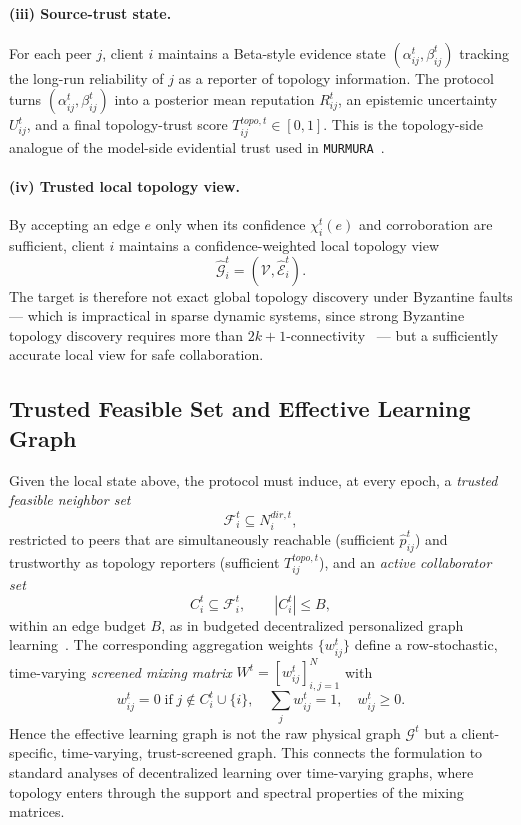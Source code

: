 \documentclass[journal]{IEEEtran}
\theoremstyle{definition}
\theoremstyle{remark}
\begin{document}
\paragraph{(iii) Source-trust state.}
For each peer $j$, client $i$ maintains a Beta-style evidence state $(\alpha_{ij}^t,\beta_{ij}^t)$ tracking the long-run reliability of $j$ as a reporter of topology information. The protocol turns $(\alpha_{ij}^t,\beta_{ij}^t)$ into a posterior mean reputation $R_{ij}^t$, an epistemic uncertainty $U_{ij}^t$, and a final topology-trust score $T_{ij}^{topo,t}\in[0,1]$. This is the topology-side analogue of the model-side evidential trust used in \texttt{MURMURA}~\cite{rangwala2025evidential}.

\paragraph{(iv) Trusted local topology view.}
By accepting an edge $e$ only when its confidence $\chi_i^t(e)$ and corroboration are sufficient, client $i$ maintains a confidence-weighted local topology view
$$
\hat{\mathcal G}_i^t = (\mathcal V,\hat{\mathcal E}_i^t).
$$
The target is therefore not exact global topology discovery under Byzantine faults — which is impractical in sparse dynamic systems, since strong Byzantine topology discovery requires more than $2k+1$-connectivity~\cite{nesterenko2009discovering} — but a sufficiently accurate local view for safe collaboration.

\subsection{Trusted Feasible Set and Effective Learning Graph}

Given the local state above, the protocol must induce, at every epoch, a \emph{trusted feasible neighbor set}
$$
\mathcal F_i^t \subseteq N_i^{dir,t},
$$
restricted to peers that are simultaneously reachable (sufficient $\hat p_{ij}^t$) and trustworthy as topology reporters (sufficient $T_{ij}^{topo,t}$), and an \emph{active collaborator set}
$$
C_i^t \subseteq \mathcal F_i^t,\qquad |C_i^t| \le B,
$$
within an edge budget $B$, as in budgeted decentralized personalized graph learning~\cite{kharrat2024decentralized}. The corresponding aggregation weights $\{w_{ij}^t\}$ define a row-stochastic, time-varying \emph{screened mixing matrix} $W^t = [w_{ij}^t]_{i,j=1}^N$ with
$$
w_{ij}^t = 0 \;\text{if}\; j\notin C_i^t\cup\{i\},\quad
\sum_{j} w_{ij}^t = 1,\quad w_{ij}^t \ge 0.
$$
Hence the effective learning graph is not the raw physical graph $\mathcal G^t$ but a client-specific, time-varying, trust-screened graph. This connects the formulation to standard analyses of decentralized learning over time-varying graphs, where topology enters through the support and spectral properties of the mixing matrices.
\end{document}
